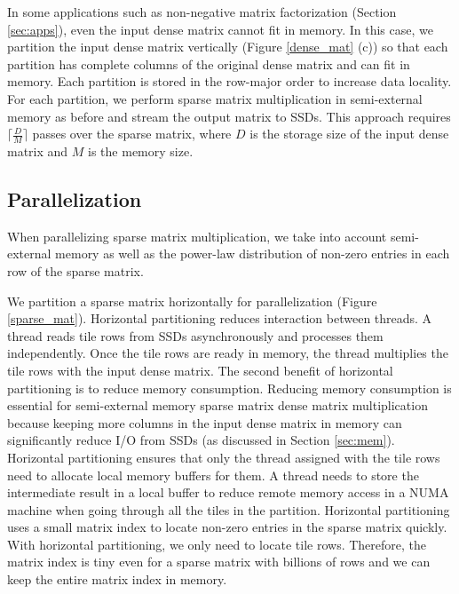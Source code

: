 In some applications such as non-negative matrix factorization (Section
\ref{sec:apps}), even the input dense matrix cannot fit in memory. In this case,
we partition the input dense matrix vertically (Figure \ref{dense_mat} (c)) so
that each partition has complete columns of the original dense matrix and can
fit in memory. Each partition is stored in the row-major order to increase
data locality. For each partition, we perform sparse matrix multiplication
in semi-external memory as before and stream the output matrix to SSDs.
This approach requires $\lceil \frac{D}{M} \rceil$ passes over the sparse matrix,
where $D$ is the storage size of the input dense matrix and $M$ is the memory
size.

\subsection{Parallelization}
When parallelizing sparse matrix multiplication, we take into account
semi-external memory as well as the power-law distribution of non-zero entries
in each row of the sparse matrix.

We partition a sparse matrix horizontally for parallelization (Figure
\ref{sparse_mat}). Horizontal partitioning reduces interaction between threads.
A thread reads tile rows from SSDs asynchronously and processes them
independently. Once the tile rows
are ready in memory, the thread multiplies the tile rows with the input
dense matrix. The second benefit of horizontal partitioning is to reduce memory
consumption. Reducing memory consumption is essential for semi-external memory
sparse matrix dense matrix multiplication because keeping more columns in
the input dense matrix in memory can significantly reduce I/O from SSDs
(as discussed in Section \ref{sec:mem}). Horizontal partitioning ensures that
only the thread assigned with the tile rows need to allocate local memory buffers
for them. A thread needs to store the intermediate result in a local buffer to
reduce remote memory access in a NUMA machine when going through all the tiles
in the partition. Horizontal partitioning uses
a small matrix index to locate non-zero entries in the sparse matrix quickly.
With horizontal partitioning, we only need to locate tile rows. Therefore,
the matrix index is tiny even for a sparse matrix with billions of rows
and we can keep the entire matrix index in memory.

